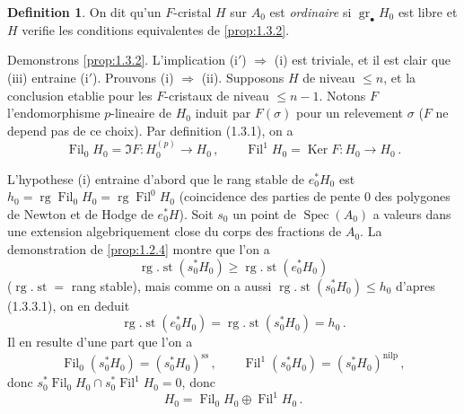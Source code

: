 \documentclass[12pt,a4paper]{article}
\theoremstyle{plain}
\theoremstyle{definition}
\newtheorem{definition}[theorem]{Definition}
\theoremstyle{remark}
\DeclareMathOperator{\Spec}{Spec}
\DeclareMathOperator{\Ker}{Ker}
\DeclareMathOperator{\gr}{gr}
\DeclareMathOperator{\Fil}{Fil}
\DeclareMathOperator{\rg}{rg}
\DeclareMathOperator{\st}{st}
\begin{document}
\begin{definition}\label{def:1.3.3}
On dit qu'un $F$-cristal $H$ sur $A_0$ est \emph{ordinaire} si $\gr_\bullet H_0$ est libre et $H$ verifie les conditions equivalentes de \ref{prop:1.3.2}.
\end{definition}

Demonstrons \ref{prop:1.3.2}. L'implication (i$'$) $\Rightarrow$ (i) est triviale, et il est clair que (iii) entraine (i$'$). Prouvons (i) $\Rightarrow$ (ii). Supposons $H$ de niveau $\leq n$, et la conclusion etablie pour les $F$-cristaux de niveau $\leq n-1$. Notons $F$ l'endomorphisme $p$-lineaire de $H_0$ induit par $F(\sigma)$ pour un relevement $\sigma$ ($F$ ne depend pas de ce choix). Par definition (1.3.1), on a
\begin{equation}\label{eq:1.3.3.1}
\Fil_0H_0 = \Im F : H_0^{(p)} \to H_0\,, \qquad \Fil^1H_0 = \Ker F : H_0 \to H_0\,.\end{equation}

L'hypothese (i) entraine d'abord que le rang stable de $e_0^*H_0$ est $h_0 = \rg \Fil_0H_0 = \rg \Fil^0H_0$ (coincidence des parties de pente 0 des polygones de Newton et de Hodge de $e_0^*H$). Soit $s_0$ un point de $\Spec(A_0)$ a valeurs dans une extension algebriquement close du corps des fractions de $A_0$. La demonstration de \ref{prop:1.2.4} montre que l'on a
\[
\rg\nolimits.\st(s_0^*H_0) \geq \rg\nolimits.\st(e_0^*H_0)
\]
($\rg\nolimits.\st =$ rang stable), mais comme on a aussi $\rg\nolimits.\st(s_0^*H_0) \leq h_0$ d'apres (1.3.3.1), on en deduit
\[
\rg\nolimits.\st(e_0^*H_0) = \rg\nolimits.\st(s_0^*H_0) = h_0\,.
\]
Il en resulte d'une part que l'on a
\[
\Fil_0(s_0^*H_0) = (s_0^*H_0)^{\mathrm{ss}}\,, \qquad \Fil^1(s_0^*H_0) = (s_0^*H_0)^{\mathrm{nilp}}\,,
\]
donc $s_0^*\Fil_0H_0 \cap s_0^*\Fil^1H_0 = 0$, donc
\begin{equation}\label{eq:1.3.3.2}
H_0 = \Fil_0H_0 \oplus \Fil^1H_0\,.\end{equation}
\end{document}
